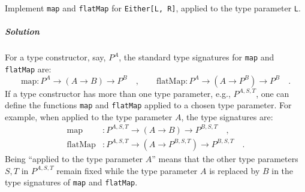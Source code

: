 Implement \lstinline!map! and \lstinline!flatMap! for \lstinline!Either[L, R]!,
applied to the type parameter \lstinline!L!.

\subparagraph{Solution}

For a type constructor, say, $P^{A}$, the standard type signatures
for \lstinline!map! and \lstinline!flatMap! are:
\[
\text{map}:P^{A}\rightarrow(A\rightarrow B)\rightarrow P^{B}\quad,\quad\quad\text{flatMap}:P^{A}\rightarrow(A\rightarrow P^{B})\rightarrow P^{B}\quad.
\]
If a type constructor has more than one type parameter, e.g., $P^{A,S,T}$,
one can define the functions \lstinline!map! and \lstinline!flatMap!
applied to a chosen type parameter. For example, when applied to the
type parameter $A$, the type signatures are:
\begin{align*}
\text{map} & :P^{A,S,T}\rightarrow(A\rightarrow B)\rightarrow P^{B,S,T}\quad,\\
\text{flatMap} & :P^{A,S,T}\rightarrow(A\rightarrow P^{B,S,T})\rightarrow P^{B,S,T}\quad.
\end{align*}
Being \textsf{``}applied to the type parameter $A$\textsf{''} means that the other
type parameters $S,T$ in $P^{A,S,T}$ remain fixed while the type
parameter $A$ is replaced by $B$ in the type signatures of \lstinline!map!
and \lstinline!flatMap!.

